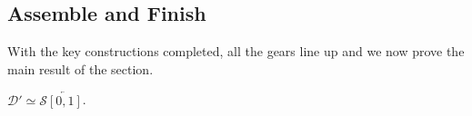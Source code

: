 \documentclass[a4paper, 11pt,reqno]{amsart}
\newcommand{\baseS}{\mathcal{S}}
\newcommand{\D}{\mathcal{D}}
\begin{document}
%




\subsection{Assemble and Finish} With the key constructions completed, all the gears line up and we now prove the main result of the section. %


\begin{theorem}\label{thm:ARCHIMEDEANPLACE} $\D'\simeq\baseS\overleftarrow{[0,1]}$. 	
\end{theorem}
\end{document}
